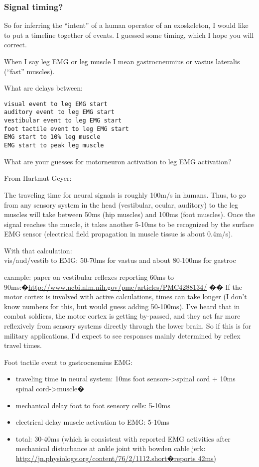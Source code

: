 \documentclass[letterpaper,12pt,fullpage]{article}
\begin{document}
\subsubsection{Signal timing?}

So for inferring the ``intent'' of a human operator of an
exoskeleton,
I would like to put a timeline together of events.
I guessed some timing, which I hope you will correct.

When I say leg EMG or leg muscle I mean
gastrocneumius or vastus lateralis (``fast'' muscles).

What are delays between:
\begin{verbatim}
visual event to leg EMG start
auditory event to leg EMG start
vestibular event to leg EMG start
foot tactile event to leg EMG start
EMG start to 10% leg muscle
EMG start to peak leg muscle
\end{verbatim}

What are your guesses for motorneuron activation to leg EMG activation?

{\b From Hartmut Geyer:}

The traveling time for neural signals is roughly 100m/s in humans.
Thus, to go from any sensory system in the head (vestibular, ocular,
auditory) to the leg muscles will take between 50ms (hip muscles) and
100ms (foot muscles). Once the signal reaches the muscle, it takes
another 5-10ms to be recognized by the surface EMG sensor (electrical
field propagation in muscle tissue is about 0.4m/s).

With that calculation:\\
vis/aud/vestib to EMG: 50-70ms for vastus and about 80-100ms for
gastroc

example: paper on vestibular reflexes reporting 60ms to
90ms:�\url{http://www.ncbi.nlm.nih.gov/pmc/articles/PMC4288134/}
��
If the motor cortex is involved with active calculations, times can
take longer (I don't know numbers for this, but would guess adding
50-100ms). I've heard that in combat soldiers, the motor cortex is
getting by-passed, and they act far more reflexively from sensory
systems directly through the lower brain. So if this is for military
applications, I'd expect to see responses mainly determined by
reflex travel times.

Foot tactile event to gastrocnemius EMG:
\begin{itemize}
\item
traveling time in neural system: 10ms foot sensors->spinal cord +
10ms spinal cord->muscle�
\item
mechanical delay foot to foot sensory cells: 5-10ms
\item
electrical delay muscle activation to EMG: 5-10ms
\item
total: 30-40ms (which is consistent with reported EMG activities
after mechanical disturbance at ankle joint with bowden cable jerk:
\url{http://jn.physiology.org/content/76/2/1112.short�reports 42ms)}
\end{itemize}
\end{document}
